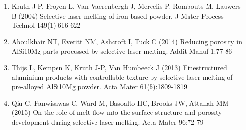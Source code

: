 \documentclass[10pt]{article}
\begin{document}
\begin{enumerate}
  \item Kruth J-P, Froyen L, Van Vaerenbergh J, Mercelis P, Rombouts M, Lauwers B (2004) Selective laser melting of iron-based powder. J Mater Process Technol 149(1):616-622

  \item Aboulkhair NT, Everitt NM, Ashcroft I, Tuck C (2014) Reducing porosity in AlSi10Mg parts processed by selective laser melting. Addit Manuf 1:77-86

  \item Thijs L, Kempen K, Kruth J-P, Van Humbeeck J (2013) Finestructured aluminium products with controllable texture by selective laser melting of pre-alloyed AlSi10Mg powder. Acta Mater 61(5):1809-1819

  \item Qiu C, Panwisawas C, Ward M, Basoalto HC, Brooks JW, Attallah MM (2015) On the role of melt flow into the surface structure and porosity development during selective laser melting. Acta Mater 96:72-79

\end{enumerate}
\end{document}
